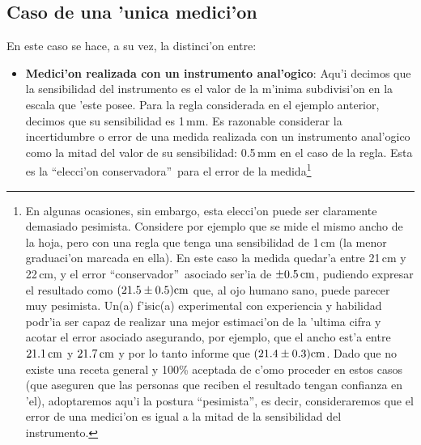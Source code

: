 \subsection{Caso de una 'unica medici'on}
En este caso se hace, a su vez, la distinci'on entre:
\begin{itemize}
\item \textbf{Medici'on realizada con un instrumento anal'ogico}: Aqu'i decimos que la sensibilidad del instrumento es el valor de la m'inima subdivisi'on en la escala que 'este posee. Para la regla considerada en el ejemplo anterior, decimos que su sensibilidad es 1\,mm. Es razonable considerar la incertidumbre o error de una medida realizada con un instrumento anal'ogico como la mitad del valor de su sensibilidad: 0.5\,mm en el caso de la regla. Esta es la ``elecci'on conservadora''\, para el error de la medida\footnote{En algunas ocasiones, sin embargo, esta elecci'on puede ser claramente demasiado pesimista. Considere por ejemplo que se mide el mismo ancho de la hoja, pero con una regla que tenga una sensibilidad de 1\,cm (la menor graduaci'on marcada en ella). En este caso la medida quedar'a entre 21\,cm y 22\,cm, y el error ``conservador''\, asociado ser'ia de $\pm 0.5\,\rm cm$, pudiendo expresar el resultado como $(21.5\pm 0.5)\rm cm$ que, al ojo humano sano, puede parecer muy pesimista. Un(a) f'isic(a) experimental con experiencia y habilidad podr'ia ser capaz de realizar una mejor estimaci'on de la 'ultima cifra y acotar el error asociado asegurando, por ejemplo, que el ancho est'a entre $21.1\,\rm cm$ y $21.7\,\rm cm$ y por lo tanto informe que $(21.4\pm 0.3)\rm cm$. Dado que no existe una receta general y 100\% aceptada de c'omo proceder en estos casos (que aseguren que las personas que reciben el resultado tengan confianza en 'el), adoptaremos aqu'i la postura ``pesimista'', es decir, consideraremos que el error de una medici'on es igual a la mitad de la sensibilidad del instrumento.}


\end{itemize}
